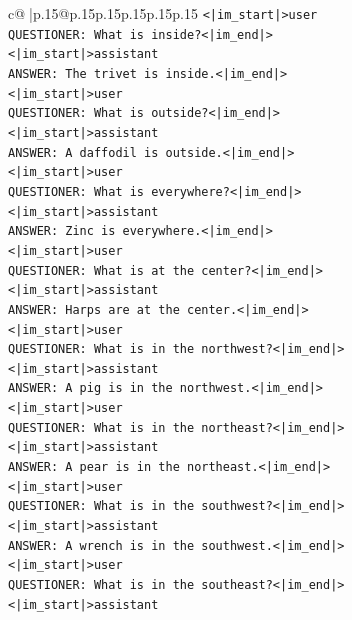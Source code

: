 \documentclass{article}
\begin{document}
{\begin{supertabular}{c@{$\;$}|p{.15\linewidth}@{}p{.15\linewidth}p{.15\linewidth}p{.15\linewidth}p{.15\linewidth}p{.15\linewidth}}
{{{\texttt{<|im\_start|>user} \\
\texttt{QUESTIONER: What is inside?<|im\_end|>} \\
\texttt{<|im\_start|>assistant} \\
\texttt{ANSWER: The trivet is inside.<|im\_end|>} \\
\texttt{<|im\_start|>user} \\
\texttt{QUESTIONER: What is outside?<|im\_end|>} \\
\texttt{<|im\_start|>assistant} \\
\texttt{ANSWER: A daffodil is outside.<|im\_end|>} \\
\texttt{<|im\_start|>user} \\
\texttt{QUESTIONER: What is everywhere?<|im\_end|>} \\
\texttt{<|im\_start|>assistant} \\
\texttt{ANSWER: Zinc is everywhere.<|im\_end|>} \\
\texttt{<|im\_start|>user} \\
\texttt{QUESTIONER: What is at the center?<|im\_end|>} \\
\texttt{<|im\_start|>assistant} \\
\texttt{ANSWER: Harps are at the center.<|im\_end|>} \\
\texttt{<|im\_start|>user} \\
\texttt{QUESTIONER: What is in the northwest?<|im\_end|>} \\
\texttt{<|im\_start|>assistant} \\
\texttt{ANSWER: A pig is in the northwest.<|im\_end|>} \\
\texttt{<|im\_start|>user} \\
\texttt{QUESTIONER: What is in the northeast?<|im\_end|>} \\
\texttt{<|im\_start|>assistant} \\
\texttt{ANSWER: A pear is in the northeast.<|im\_end|>} \\
\texttt{<|im\_start|>user} \\
\texttt{QUESTIONER: What is in the southwest?<|im\_end|>} \\
\texttt{<|im\_start|>assistant} \\
\texttt{ANSWER: A wrench is in the southwest.<|im\_end|>} \\
\texttt{<|im\_start|>user} \\
\texttt{QUESTIONER: What is in the southeast?<|im\_end|>} \\
\texttt{<|im\_start|>assistant} \\
}}}
\end{supertabular}}
\end{document}
